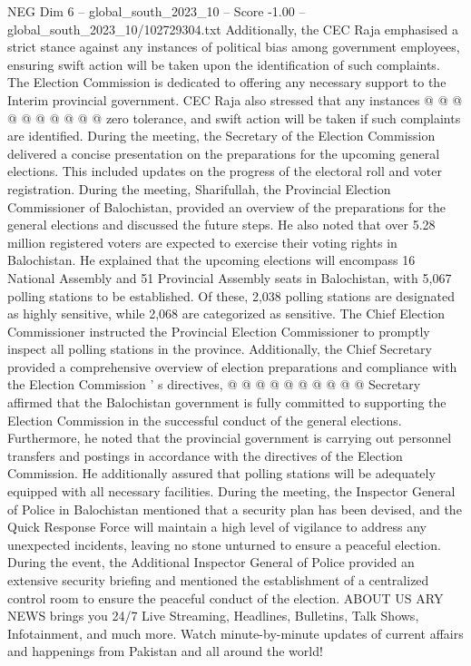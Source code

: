 \begin{textsample}{NEG Dim 6 – global\_south\_2023\_10 – Score -1.00 – global\_south\_2023\_10/102729304.txt}
Additionally, the CEC Raja emphasised a strict stance against any instances of political bias among government employees, ensuring swift action will be taken upon the identification of such complaints.
The Election Commission is dedicated to offering any necessary support to the Interim provincial government.
CEC Raja also stressed that any instances @ @ @ @ @ @ @ @ @ @ zero tolerance, and swift action will be taken if such complaints are identified.
During the meeting, the Secretary of the Election Commission delivered a concise presentation on the preparations for the upcoming general elections.
This included updates on the progress of the electoral roll and voter registration.
During the meeting, Sharifullah, the Provincial Election Commissioner of Balochistan, provided an overview of the preparations for the general elections and discussed the future steps.
He also noted that over 5.28 million registered voters are expected to exercise their voting rights in Balochistan.
He explained that the upcoming elections will encompass 16 National Assembly and 51 Provincial Assembly seats in Balochistan, with 5,067 polling stations to be established.
Of these, 2,038 polling stations are designated as highly sensitive, while 2,068 are categorized as sensitive.
The Chief Election Commissioner instructed the Provincial Election Commissioner to promptly inspect all polling stations in the province.
Additionally, the Chief Secretary provided a comprehensive overview of election preparations and compliance with the Election Commission ' s directives, @ @ @ @ @ @ @ @ @ @ Secretary affirmed that the Balochistan government is fully committed to supporting the Election Commission in the successful conduct of the general elections.
Furthermore, he noted that the provincial government is carrying out personnel transfers and postings in accordance with the directives of the Election Commission.
He additionally assured that polling stations will be adequately equipped with all necessary facilities.
During the meeting, the Inspector General of Police in Balochistan mentioned that a security plan has been devised, and the Quick Response Force will maintain a high level of vigilance to address any unexpected incidents, leaving no stone unturned to ensure a peaceful election.
During the event, the Additional Inspector General of Police provided an extensive security briefing and mentioned the establishment of a centralized control room to ensure the peaceful conduct of the election.
ABOUT US ARY NEWS brings you 24/7 Live Streaming, Headlines, Bulletins, Talk Shows, Infotainment, and much more.
Watch minute-by-minute updates of current affairs and happenings from Pakistan and all around the world!

\end{textsample}
